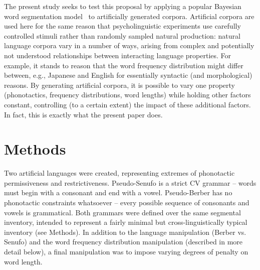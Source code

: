 \documentclass[11pt]{article}
\begin{document}
The present study seeks to test this proposal by applying a popular Bayesian word segmentation model~\cite{Brent99a,Goldwater07c,Goldwater09a} to artificially generated corpora. Artificial corpora are used here for the same reason that psycholinguistic experiments use carefully controlled stimuli rather than randomly sampled natural production: natural language corpora vary in a number of ways, arising from complex and potentially not understood relationships between interacting language properties. %
For example, it stands to reason that the word frequency distribution might differ between, e.g., Japanese and English for essentially syntactic (and morphological) reasons. %
By generating artificial corpora, it is possible to vary one property (phonotactics, frequency distributions, word lengths) while holding other factors constant, controlling (to a certain extent) the impact of these additional factors. In fact, this is exactly what the present paper does.


\section{Methods}
\vspace*{-5pt}
Two artificial languages were created, representing extremes of phonotactic permissiveness and restrictiveness. Pseudo-Senufo is a strict CV grammar -- words must begin with a consonant and end with a vowel.%
Pseudo-Berber has no phonotactic constraints whatsoever -- every possible sequence of consonants and vowels is grammatical. Both grammars were defined over the same segmental inventory, intended to represent a fairly minimal but cross-linguistically typical inventory (see Methods). In addition to the language manipulation (Berber vs. Senufo) and the word frequency distribution manipulation (described in more detail below), a final manipulation was to impose varying degrees of penalty on word length.
 
\end{document}
